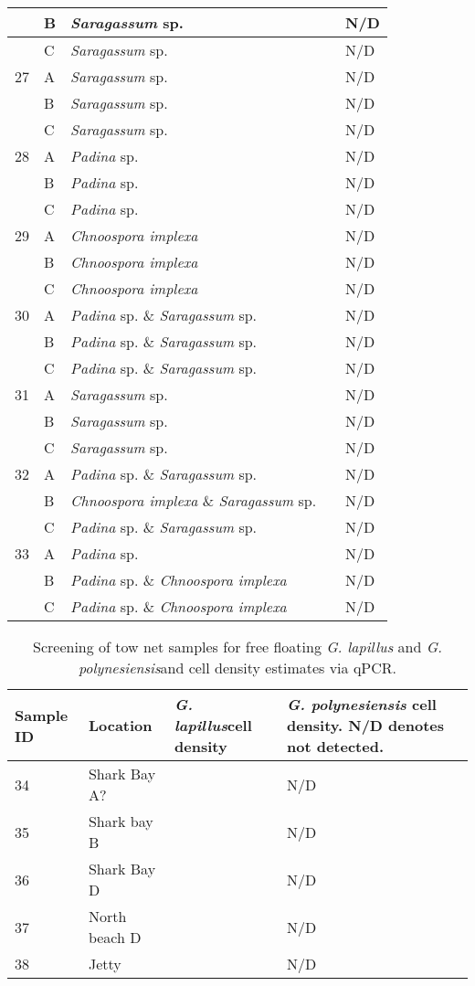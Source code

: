 \documentclass[12pt]{article}
\begin{document}
\begin{longtable}{ | p{1cm} | p{1cm} | p{3cm} | p{4cm} | p{4cm} | }
\hline
&B&\emph{Saragassum} sp.&&N/D\\
\hline
&C&\emph{Saragassum} sp.&&N/D\\
\hline
27&A&\emph{Saragassum} sp.&&N/D\\
\hline
&B&\emph{Saragassum} sp.&&N/D\\
\hline
&C&\emph{Saragassum} sp.&&N/D\\
\hline
28&A&\emph{Padina} sp.&&N/D\\
\hline
&B&\emph{Padina} sp.&&N/D\\
\hline
&C&\emph{Padina} sp.&&N/D\\
\hline
29&A&\emph{Chnoospora implexa}&&N/D\\
\hline
&B&\emph{Chnoospora implexa}&&N/D\\
\hline
&C&\emph{Chnoospora implexa}&&N/D\\
\hline
30&A&\emph{Padina} sp. \& \emph{Saragassum} sp.&&N/D\\
\hline
&B&\emph{Padina} sp. \& \emph{Saragassum} sp.&&N/D\\
\hline
&C&\emph{Padina} sp. \& \emph{Saragassum} sp.&&N/D\\
\hline
31&A&\emph{Saragassum} sp.&&N/D\\
\hline
&B&\emph{Saragassum} sp.&&N/D\\
\hline
&C&\emph{Saragassum} sp.&&N/D\\
\hline
32&A&\emph{Padina} sp. \& \emph{Saragassum} sp.&&N/D\\
\hline
&B&\emph{Chnoospora implexa} \& \emph{Saragassum} sp.&&N/D\\
\hline
&C&\emph{Padina} sp. \& \emph{Saragassum} sp.&&N/D\\
\hline
33&A&\emph{Padina} sp.&&N/D\\
\hline
&B&\emph{Padina} sp. \& \emph{Chnoospora implexa}&&N/D\\
\hline
&C&\emph{Padina} sp. \& \emph{Chnoospora implexa}&&N/D\\
\hline
\end{longtable}
\FloatBarrier
\FloatBarrier
\begin{table}
\caption{Screening of tow net samples for free floating \emph{G. lapillus} and \emph{G. polynesiensis}and cell density estimates via qPCR.}
\label{tbl:NetTable}
\begin{tabular}{ | p{4cm} | p{4cm} |p{4cm} | p{4cm} | }
\hline
\textbf{Sample ID}&\textbf{Location}&\textbf{\emph{G. lapillus}cell density}&\textbf{\emph{G. polynesiensis} cell density. N/D denotes not detected.}\\
\hline
34&Shark Bay A?&&N/D\\
\hline
35&Shark bay B&&N/D\\
\hline
36&Shark Bay D&&N/D\\
\hline
37&North beach D&&N/D\\
\hline
38&Jetty&&N/D\\
\hline
\end{tabular}
\end{table}
\FloatBarrier
\newpage
\end{document}
